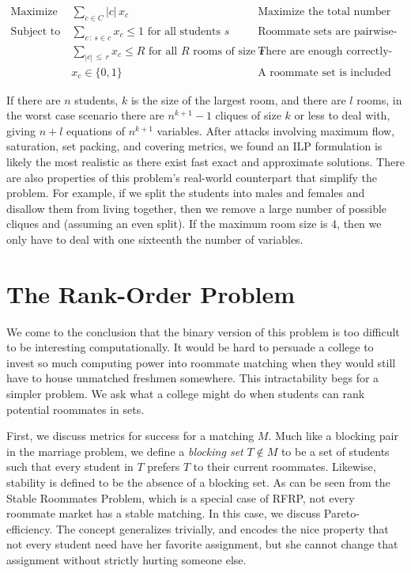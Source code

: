 \documentclass[11pt]{article}
\begin{document}
\begin{align*}
\text{Maximize }   & \sum_{c \in C} |c| \, x_c &&\text{Maximize the total number of students covered}\\
\text{Subject to } & \sum_{c \, : \, s \in c} x_c \leq 1 \text{ for all students $s$} && \text{Roommate sets are pairwise-disjoint}\\
& \sum_{|c| \, \leq \, r} x_c \leq R \text{ for all $R$ rooms of size $r$} && \text{There are enough correctly-sized rooms}\\
& x_c \in \{0, 1\} && \text{A roommate set is included or not}
\end{align*}

If there are $n$ students, $k$ is the size of the largest room, and there are $l$ rooms, in the worst case scenario there are $n^{k + 1} - 1$ cliques of size $k$ or less to deal with, giving $n + l$ equations of $n^{k + 1}$ variables.  After attacks involving maximum flow, saturation, set packing, and covering metrics, we found an ILP formulation is likely the most realistic as there exist fast exact and approximate solutions. There are also properties of this problem's real-world counterpart that simplify the problem. For example, if we split the students into males and females and disallow them from living together, then we remove a large number of possible cliques and (assuming an even split). If the maximum room size is 4, then we only have to deal with one sixteenth the number of variables.


\section*{The Rank-Order Problem}
We come to the conclusion that the binary version of this problem is too difficult to be interesting computationally. It would be hard to persuade a college to invest so much computing power into roommate matching when they would still have to house unmatched freshmen somewhere. This intractability begs for a simpler problem. We ask what a college might do when students can rank potential roommates in sets. 

First, we discuss metrics for success for a matching $M$. Much like a blocking pair in the marriage problem, we define a \textit{blocking set} $T \notin M$ to be a set of students such that every student in $T$ prefers $T$ to their current roommates. Likewise, stability is defined to be the absence of a blocking set. As can be seen from the Stable Roommates Problem, which is a special case of RFRP, not every roommate market has a stable matching. In this case, we discuss Pareto-efficiency. The concept generalizes trivially, and encodes the nice property that not every student need have her favorite assignment, but she cannot change that assignment without strictly hurting someone else. 
\end{document}
